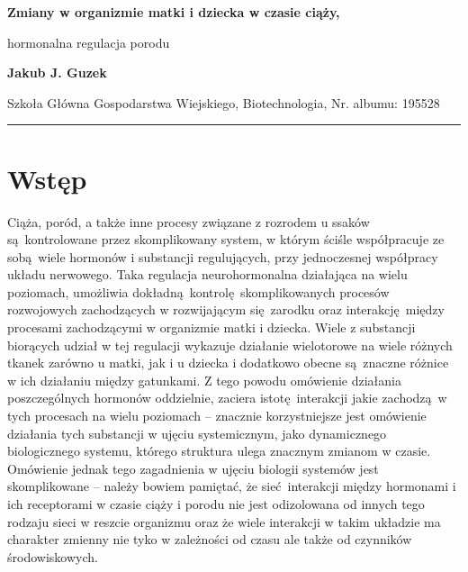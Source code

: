 \documentclass[two column, twoside, a4paper]{article}
\begin{document}
\begin{strip}
{\sc \bfseries \LARGE {}\selectfont Zmiany w organizmie matki i dziecka w czasie ciąży,

\vspace{2pt} hormonalna regulacja porodu} \vspace{\baselineskip}

{\bfseries \large Jakub J. Guzek}

{Szkoła Główna Gospodarstwa Wiejskiego, Biotechnologia, Nr. albumu: 195528}\vspace{\baselineskip}

\hrule
\end{strip}

\section{Wstęp}

Ciąża, poród, a także inne procesy związane z rozrodem u ssaków są kontrolowane przez skomplikowany system, w którym ściśle współpracuje ze sobą wiele hormonów i substancji regulujących, przy jednoczesnej współpracy układu nerwowego. Taka regulacja neurohormonalna działająca na wielu poziomach, umożliwia dokładną kontrolę skomplikowanych procesów rozwojowych zachodzących w rozwijającym się zarodku oraz interakcję między procesami zachodzącymi w organizmie matki i dziecka. Wiele z substancji biorących udział w tej regulacji wykazuje działanie wielotorowe na wiele różnych tkanek zarówno u matki, jak i u dziecka i dodatkowo obecne są znaczne różnice w ich działaniu między gatunkami.
Z tego powodu omówienie działania poszczególnych hormonów oddzielnie, zaciera istotę interakcji jakie zachodzą w tych procesach na wielu poziomach -- znacznie korzystniejsze jest omówienie działania tych substancji w ujęciu systemicznym, jako dynamicznego biologicznego systemu, którego struktura ulega znacznym zmianom w czasie. Omówienie jednak tego zagadnienia w ujęciu biologii systemów jest skomplikowane -- należy bowiem pamiętać, że sieć interakcji między hormonami i ich receptorami w czasie ciąży i porodu nie jest odizolowana od innych tego rodzaju sieci w reszcie organizmu oraz że wiele interakcji w takim układzie ma charakter zmienny nie tyko w zależności od czasu ale także od czynników środowiskowych.
\end{document}
